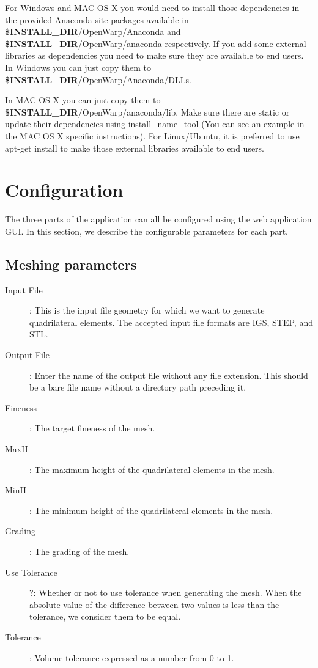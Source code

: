 \documentclass[12pt]{article}
\newcommand{\INSTALLDIR}{{\textbf{\$INSTALL{\_}DIR}}}
\begin{document}
For Windows and MAC OS X you would need to install those dependencies in the provided Anaconda site-packages available in \INSTALLDIR/OpenWarp/Anaconda and \INSTALLDIR/OpenWarp/anaconda respectively.
If you add some external libraries as dependencies you need to make sure they are available to end users. In Windows you can just copy them to \INSTALLDIR/OpenWarp/Anaconda/DLLs.

In MAC OS X you can just copy them to \INSTALLDIR/OpenWarp/anaconda/lib. Make sure there are static or update their dependencies using install_name_tool (You can see an example in the MAC OS X specific instructions).
For Linux/Ubuntu, it is preferred to use apt-get install to make those external libraries available to end users.

\section{Configuration}
The three parts of the application can all be configured using the web application GUI. In this section, we describe the configurable parameters for each part.

\subsection{Meshing parameters}

\begin{description}
	\item [Input File]: This is the input file geometry for which we want to generate quadrilateral elements. The accepted input file formats are IGS, STEP, and STL.
\item [Output File]: Enter the name of the output file without any file extension. This should be a bare file name without a directory path preceding it.
\item [Fineness]: The target fineness of the mesh.
\item [MaxH]: The maximum height of the quadrilateral elements in the mesh. 
\item [MinH]: The minimum height of the quadrilateral elements in the mesh. 
\item [Grading]: The grading of the mesh.
\item [Use Tolerance]?: Whether or not to use tolerance when generating the mesh. When the absolute value of the difference between two values is less than the tolerance, we consider them to be equal.
\item [Tolerance]: Volume tolerance expressed as a number from 0 to 1.
\end{description}
\end{document}
